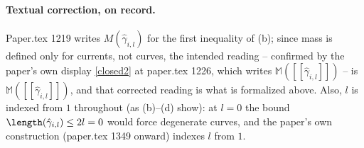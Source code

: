 \begin{theorem}
  \paragraph{Textual correction, on record.} Paper.tex 1219 writes $M(\hat\gamma_{i,l})$ for the
  first inequality of (b); since mass is defined only for currents, not curves, the intended
  reading -- confirmed by the paper's own display \eqref{closed2} at paper.tex 1226, which writes
  $\mathbb M([[\hat\gamma_{i,l}]])$ -- is $\mathbb M([[\hat\gamma_{i,l}]])$, and that corrected
  reading is what is formalized above. Also, $l$ is indexed from $1$ throughout (as (b)--(d) show):
  at $l=0$ the bound $\length(\hat\gamma_{i,l})\le 2l=0$ would force degenerate curves, and the
  paper's own construction (paper.tex 1349 onward) indexes $l$ from $1$.
\end{theorem}
